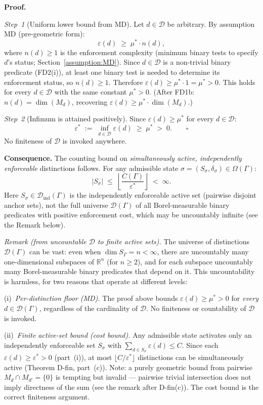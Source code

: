 \documentclass[11pt]{article}
\theoremstyle{remark}
\begin{document}
\begin{tcolorbox}[apfbox, title={$L_{\varepsilon^*}$ (Minimum Cost) --- Theorem}]
\smallskip\noindent\textbf{Proof.}

\textit{Step~1} (Uniform lower bound from MD).  Let $d \in \mathcal{D}$ be arbitrary.  By assumption MD (pre-geometric form):
\[
\varepsilon(d) \;\geq\; \mu^* \cdot n(d),
\]
where $n(d) \ge 1$ is the enforcement complexity (minimum binary tests to specify $d$'s status; Section~\ref{assumption:MD}).  Since $d \in \mathcal{D}$ is a non-trivial binary predicate (FD2(i)), at least one binary test is needed to determine its enforcement status, so $n(d) \geq 1$.  Therefore $\varepsilon(d) \geq \mu^* \cdot 1 = \mu^* > 0$.  This holds for every $d \in \mathcal{D}$ with the same constant $\mu^* > 0$.  (After FD1b: $n(d) = \dim(M_d)$, recovering $\varepsilon(d) \ge \mu^* \cdot \dim(M_d)$.)

\textit{Step~2} (Infimum is attained positively).  Since $\varepsilon(d) \geq \mu^*$ for every $d \in \mathcal{D}$:
\[
\varepsilon^* \;:=\; \inf_{d \in \mathcal{D}} \varepsilon(d) \;\geq\; \mu^* \;>\; 0. \qquad \square
\]
No finiteness of $\mathcal{D}$ is invoked anywhere.

\smallskip\noindent\textbf{Consequence.}  The counting bound on \emph{simultaneously active, independently enforceable} distinctions follows.  For any admissible state $\sigma = (S_\sigma, \delta_\sigma) \in \Omega(\Gamma)$:
\[
|S_\sigma| \;\le\; \left\lfloor \frac{C(\Gamma)}{\varepsilon^*} \right\rfloor \;<\; \infty.
\]
Here $S_\sigma \in \mathcal{D}_{\mathrm{ind}}(\Gamma)$ is the independently enforceable active set (pairwise disjoint anchor sets), not the full universe $\mathcal{D}(\Gamma)$ of all Borel-measurable binary predicates with positive enforcement cost, which may be uncountably infinite (see the Remark below).

\smallskip\noindent\textit{Remark (from uncountable $\mathcal{D}$ to finite active sets).}  The universe of distinctions $\mathcal{D}(\Gamma)$ can be vast: even when $\dim S_\Gamma = n < \infty$, there are uncountably many one-dimensional subspaces of $\mathbb{R}^n$ (for $n \ge 2$), and for each subspace uncountably many Borel-measurable binary predicates that depend on it.  This uncountability is harmless, for two reasons that operate at different levels:

(i)~\emph{Per-distinction floor (MD).}  The proof above bounds $\varepsilon(d) \ge \mu^* > 0$ for \emph{every} $d \in \mathcal{D}(\Gamma)$, regardless of the cardinality of $\mathcal{D}$.  No finiteness or countability of $\mathcal{D}$ is invoked.

(ii)~\emph{Finite active-set bound (cost bound).}  Any admissible state activates only an independently enforceable set $S_\sigma$ with $\sum_{d \in S_\sigma} \varepsilon(d) \le C$.  Since each $\varepsilon(d) \ge \varepsilon^* > 0$ (part~(i)), at most $\lfloor C/\varepsilon^* \rfloor$ distinctions can be simultaneously active (Theorem D-fin, part~(c)).  Note: a purely geometric bound from pairwise $M_d \cap M_{d'} = \{0\}$ is tempting but invalid --- pairwise trivial intersection does not imply directness of the sum (see the remark after D-fin(c)).  The cost bound is the correct finiteness argument.


\end{tcolorbox}
\end{document}
